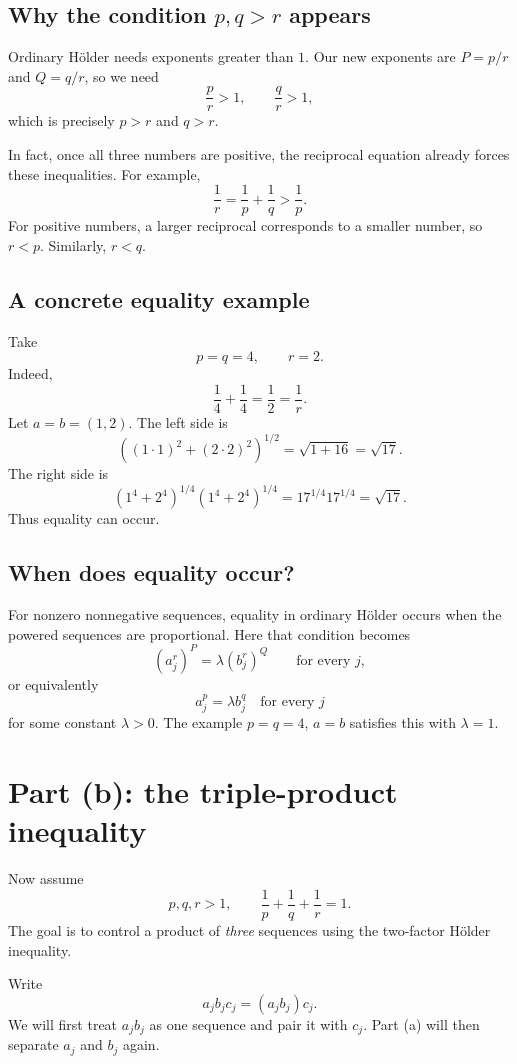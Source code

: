 \documentclass[11pt]{article}
\begin{document}
\subsection{Why the condition \(p,q>r\) appears}

Ordinary H\"older needs exponents greater than \(1\). Our new exponents are \(P=p/r\) and \(Q=q/r\), so we need
\[
  \frac{p}{r}>1,
  \qquad
  \frac{q}{r}>1,
\]
which is precisely \(p>r\) and \(q>r\).

In fact, once all three numbers are positive, the reciprocal equation already forces these inequalities. For example,
\[
  \frac1r=\frac1p+\frac1q>\frac1p.
\]
For positive numbers, a larger reciprocal corresponds to a smaller number, so \(r<p\). Similarly, \(r<q\).

\subsection{A concrete equality example}

Take
\[
  p=q=4,
  \qquad
  r=2.
\]
Indeed,
\[
  \frac14+\frac14=\frac12=\frac1r.
\]
Let \(a=b=(1,2)\). The left side is
\[
 \left((1\cdot1)^2+(2\cdot2)^2\right)^{1/2}
 =\sqrt{1+16}
 =\sqrt{17}.
\]
The right side is
\[
 (1^4+2^4)^{1/4}(1^4+2^4)^{1/4}
 =17^{1/4}17^{1/4}
 =\sqrt{17}.
\]
Thus equality can occur.

\subsection{When does equality occur?}

For nonzero nonnegative sequences, equality in ordinary H\"older occurs when the powered sequences are proportional. Here that condition becomes
\[
  (a_j^r)^P=\lambda(b_j^r)^Q
  \qquad\text{for every }j,
\]
or equivalently
\[
  \boxed{a_j^p=\lambda b_j^q\quad\text{for every }j}
  \tag{20}
\]
for some constant \(\lambda>0\). The example \(p=q=4\), \(a=b\) satisfies this with \(\lambda=1\).

\section{Part (b): the triple-product inequality}

Now assume
\[
  p,q,r>1,
  \qquad
  \frac1p+\frac1q+\frac1r=1.
  \tag{21}
\]
The goal is to control a product of \emph{three} sequences using the two-factor H\"older inequality.

\begin{ideaBox}
Write
\[
  a_jb_jc_j=(a_jb_j)c_j.
\]
We will first treat \(a_jb_j\) as one sequence and pair it with \(c_j\). Part (a) will then separate \(a_j\) and \(b_j\) again.
\end{ideaBox}
\end{document}
